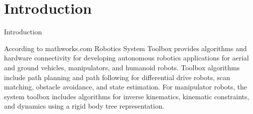 \documentclass{beamer}
\begin{document}
\section{Introduction}
\begin{frame}{Introduction}
\begin{block}{According to mathworks.com}
Robotics System Toolbox provides algorithms and hardware connectivity for developing
autonomous robotics applications for aerial and ground vehicles, manipulators, and
humanoid robots. Toolbox algorithms include path planning and path following for
differential drive robots, scan matching, obstacle avoidance, and state estimation. For
manipulator robots, the system toolbox includes algorithms for inverse kinematics,
kinematic constraints, and dynamics using a rigid body tree representation.
\end{block}

\end{frame}
\end{document}
